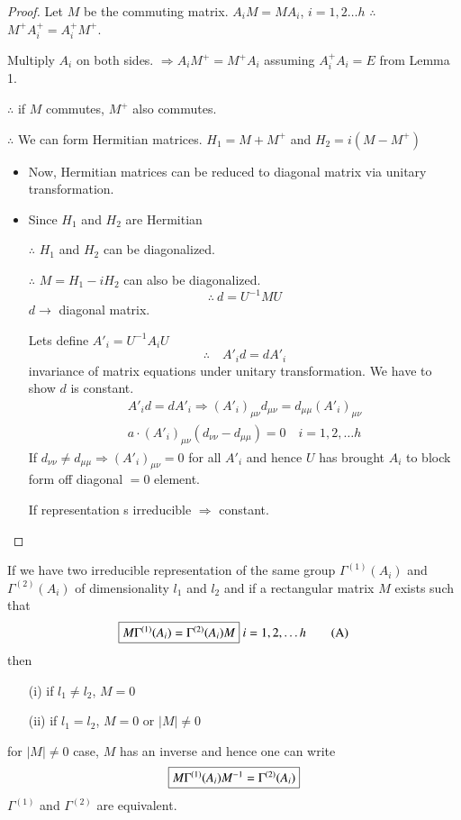 \begin{proof}
Let $M$ be the commuting matrix. $A_{i}M=MA_{i}$, $i=1,2\ldots h$ $\therefore$ $M^{+}A_{i}^{+}=A^{+}_{i}M^{+}$.

Multiply $A_{i}$ on both sides. $\Rightarrow A_{i}M^{+}=M^{+}A_{i}$ assuming $A^{+}_{i}A_{i}=E$ from Lemma 1.

$\therefore$ if $M$ commutes, $M^{+}$ also commutes.

$\therefore$ We can form Hermitian matrices. $H_{1}=M+M^{+}$ and $H_{2}=i(M-M^{+})$
\begin{itemize}
\item Now, Hermitian matrices can be reduced to diagonal matrix via unitary transformation.

\item Since $H_{1}$ and $H_{2}$ are Hermitian 

$\therefore$ $H_{1}$ and $H_{2}$ can be diagonalized.

$\therefore$ $M=H_{1}-iH_{2}$ can also be diagonalized.
$$
\therefore \ d=U^{-1}MU
$$
$d\to$ diagonal matrix.

Lets define $A'_{i}=U^{-1}A_{i}U$
$$
\therefore\quad A'_{i}d=dA'_{i}
$$
invariance of matrix equations under unitary transformation. We have to show $d$ is constant. 
\begin{gather*}
A'_{i}d=dA'_{i}\Rightarrow (A'_{i})_{\mu\nu}d_{\mu\nu}=d_{\mu\mu}(A'_{i})_{\mu\nu}\\
a\cdot (A'_{i})_{\mu\nu}(d_{\nu\nu}-d_{\mu\mu})=0\quad i=1,2,\ldots h
\end{gather*}
If $d_{\nu\nu}\neq d_{\mu\mu}\Rightarrow (A'_{i})_{\mu\nu}=0$ for all $A'_{i}$ and hence $U$ has brought $A_{i}$ to block form off diagonal $=0$ element.

If representation s irreducible  $\Rightarrow$ constant.
\end{itemize}
\end{proof}

\setcounter{lem}{2}
\begin{lem}\label{lec6-lem3}
If we have two irreducible representation of the same group $\Gamma^{(1)}(A_{i})$ and $\Gamma^{(2)}(A_{i})$ of dimensionality $l_{1}$ and $l_{2}$ and if a rectangular matrix $M$ exists such that
\begin{equation*}
\fbox{$M\Gamma^{(1)}(A_{i})=\Gamma^{(2)}(A_{i})M$} \ i=1,2,\ldots h\tag{A}\label{lec6-eqA}
\end{equation*}
then
\begin{itemize}
\item[(i)] if $l_{1}\neq l_{2}$, $M=0$
\item[(ii)] if $l_{1}=l_{2}$, $M=0$ or $|M|\neq 0$
\end{itemize}
for $|M|\neq 0$ case, $M$ has an inverse and hence one can write
$$
\fbox{$M\Gamma^{(1)}(A_{i})M^{-1}=\Gamma^{(2)}(A_{i})$}
$$
$\Gamma^{(1)}$ and $\Gamma^{(2)}$ are equivalent.
\end{lem}

